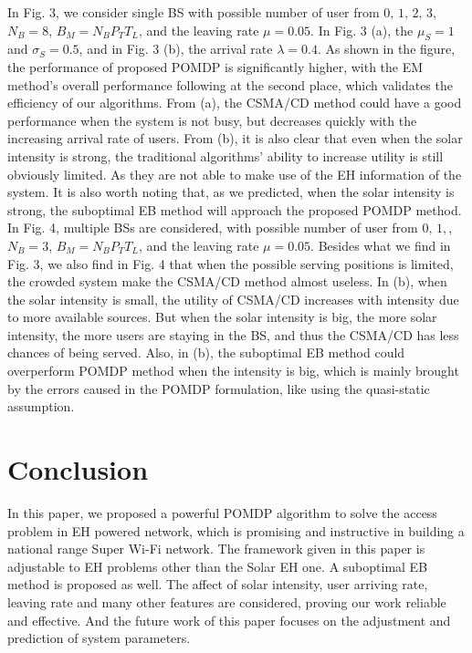 \documentclass[conference]{IEEEtran}
\begin{document}
\indent In Fig. 3, we consider single BS with possible number of user from \(0,\, 1,\, 2,\, 3\), \(N_B = 8\), \(B_M = N_BP_TT_L\),
and the leaving rate \(\mu = 0.05\). 
In Fig. 3 (a), the \(\mu_S = 1\) and \(\sigma_S = 0.5\), and in Fig. 3 (b), the arrival rate \(\lambda = 0.4\). 
As shown in the figure, the performance of proposed POMDP is significantly higher,
with the EM method's overall performance following at the second place,
which validates the efficiency of our algorithms.
From (a), the CSMA/CD method could have a good performance when the system is not busy,
but decreases quickly with the increasing arrival rate of users.
From (b), it is also clear that even when the solar intensity is strong, 
the traditional algorithms' ability to increase utility is still obviously limited.
As they are not able to make use of the EH information of the system.
It is also worth noting that, as we predicted, when the solar intensity is strong,
the suboptimal EB method will approach the proposed POMDP method.\\
\indent In Fig. 4, multiple BSs are considered, with possible number of user from \(0,\, 1,\), \(N_B = 3\), \(B_M = N_BP_TT_L\),
and the leaving rate \(\mu = 0.05\). 
Besides what we find in Fig. 3, we also find in Fig. 4 
that when the possible serving positions is limited, the crowded system make the CSMA/CD method almost useless.
In (b), when the solar intensity is small, the utility of CSMA/CD increases with intensity due to more available sources.
But when the solar intensity is big, 
the more solar intensity, the more users are staying in the BS, 
and thus the CSMA/CD has less chances of being served.
Also, in (b), the suboptimal EB method could overperform POMDP method when the intensity is big, 
which is mainly brought by the errors caused in the POMDP formulation, like using the quasi-static assumption.
\section{Conclusion}
In this paper, we proposed a powerful POMDP algorithm to solve the access problem in EH powered network,
which is promising and instructive in building a national range Super Wi-Fi network.
The framework given in this paper is adjustable to EH problems other than the Solar EH one.
A suboptimal EB method is proposed as well.
The affect of solar intensity, user arriving rate, leaving rate and many other features are considered, 
proving our work reliable and effective.
And the future work of this paper focuses on the adjustment and prediction of system parameters.


\end{document}
